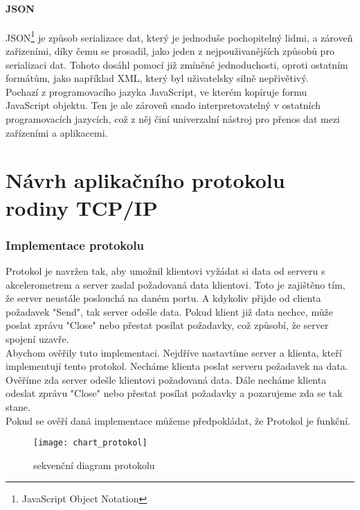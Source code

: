 \documentclass[12pt]{report}			%
\begin{document}
\cite{DHCP1}
\cite{DHCP2}
\cite{DHCP3}
\cite{DHCP4}


				\subsection{JSON}
JSON\footnote{JavaScript Object Notation} je způsob serializace dat, který je jednoduše pochopitelný lidmi, a zároveň zařizeními, díky čemu se prosadil, jako jeden z nejpouživanějších způsobů pro serializaci dat. Tohoto dosáhl pomocí již zmíněné jednoduchosti, oproti ostatním formátům, jako například XML, který byl uživatelsky silně nepřivětivý. 
\\
Pochazí z programovacího jazyka JavaScript, ve kterém kopíruje formu JavaScript objektu. Ten je ale zároveň snado interpretovatelný v ostatních programovacích jazycích, což z něj činí univerzalní nástroj pro přenos dat mezi zařízeními a aplikacemi. 

\cite{JSON1}
\cite{JSON2}
\cite{JSON3}
\cite{JSON4}


			

	\part{Návrh aplikačního protokolu rodiny TCP/IP}



\section{Implementace protokolu}
Protokol je navržen tak, aby umožnil klientovi vyžádat si data od serveru s akcelerometrem a server zaslal požadovaná data klientovi. Toto je zajištěno tím, že server neustále poslouchá na daném portu. A kdykoliv přijde od clienta požadavek "Send", tak server odešle data. Pokud klient již data nechce, může poslat zprávu "Close" nebo přestat posílat požadavky, což způsobí, že server spojení uzavře.
\\
Abychom ověřily tuto implementaci. Nejdříve nastavtíme server a klienta, kteří implementují tento protokol. Necháme klienta poslat serveru požadavek na data. Ověříme zda server odešle klientovi požadovaná data. Dále necháme klienta odeslat zprávu "Close" nebo přestat posílat požadavky a pozarujeme zda se tak stane.
\\
Pokud se ověří daná implementace můžeme předpokládat, že Protokol je funkční.
\\

\begin{figure}
\caption{sekvenční diagram protokolu}
\centering
 \texttt{[image: chart\_protokol]}
\end{figure}
\end{document}
